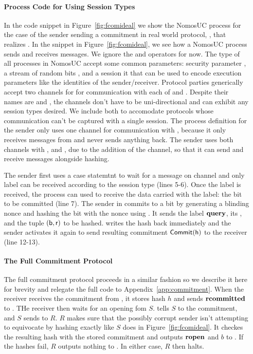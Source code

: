\paragraph{Process Code for Using Session Types}
In the code snippet in Figure~\ref{fig:fcomideal} we show the NomosUC process for the case of the sender sending a commitment in real world protocol, \protcom, that realizes \Fcom.
In the \protcom snippet in Figure~\ref{fig:fcomideal}, we see how a NomosUC process sends and receives messages. We ignore the \ipay and \iget operators for now.
The type of all processes in NomosUC accept some common parameters: security parameter , a stream of random bits , and a session it  that can be used to encode execution parameters like the identities of the sender/receiver.
Protocol parties generically accept two channels for for communication with each of \F and \Z. 
Despite their names are  and , the channels don't have to be uni-directional and can exhibit any session types desired. We include both to accomodate protocols whose communication can't be captured with a single session.
The process definition for the sender only uses one channel for communication with \Z, because it only receives messages from \Z and never sends anything back.
The sender uses both channels with \Fro,  and , due to the addition of the channel, so that it can send and receive messages alongside hashing. 

The sender first uses a case statemtnt to wait for a message on channel  and only label  can be received according to the session type (lines 5-6).
Once the label is received, the process can used \inline{$\nrecv$} to receive the data carried with the label: the bit to be committed (line 7). 
The sender in \protcom commits to a bit by generating a blinding nonce and hashing the bit with the nonce using \Fro.
It sends the label $\mathbf{query}$, its , and the tuple $\mathsf{(b,r)}$ to be hashed.
\Fro writes the hash back immediately and the sender activates it again to send resulting commitment $\mathsf{Commit(h)}$ to the receiver (line 12-13).

\paragraph{The Full Commitment Protocol}
The full commitment protocol proceeds in a similar fashion so we describe it here for brevity and relegate the full code to Appendix~\ref{app:commitment}.
When the receiver receives the commitment from \Fro, it stores hash $h$ and sends $\mathbf{rcommitted}$ to \Z.
THe receiver then waits for an opening fom $S$.
\Z tells $S$ to  the commitment, and $S$ sends  to $R$. 
$R$ makes sure that the possibly corrupt sender isn't attempting to equivocate by hashing  exactly like $S$ does in Figure~\ref{fig:fcomideal}.
It checkes the resulting hash with the stored commitment and outputs $\mathbf{ropen}$ and $b$ to \Z.
If the hashes fail, $R$ outputs nothing to \Z. In either case, $R$ then halts.


